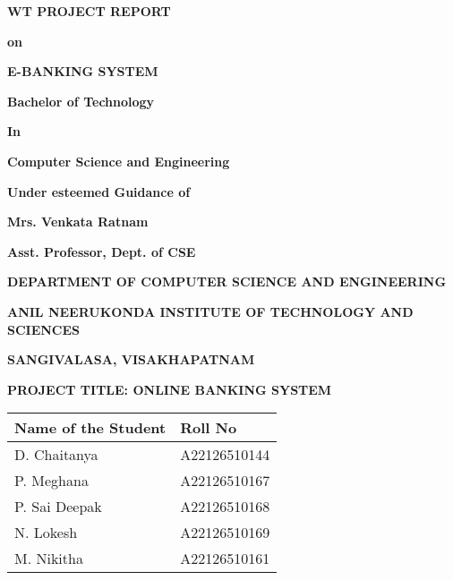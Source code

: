 \documentclass[12pt,a4paper]{report}
\begin{document}
\begin{titlepage}
    \centering
    \vspace*{1cm}
    {\huge\bfseries WT PROJECT REPORT\par}
    \vspace{1cm}
    {\Large\bfseries on\par}
    \vspace{1cm}
    {\huge\bfseries E-BANKING SYSTEM\par}
    \vspace{2cm}
    {\Large\bfseries Bachelor of Technology\par}
    \vspace{0.5cm}
    {\Large\bfseries In\par}
    \vspace{0.5cm}
    {\Large\bfseries Computer Science and Engineering\par}
    \vspace{2cm}
    {\Large\bfseries Under esteemed Guidance of\par}
    \vspace{0.5cm}
    {\Large\bfseries Mrs. Venkata Ratnam\par}
    \vspace{0.5cm}
    {\Large\bfseries Asst. Professor, Dept. of CSE\par}
    \vspace{2cm}
    {\Large\bfseries DEPARTMENT OF COMPUTER SCIENCE AND ENGINEERING\par}
    \vspace{0.5cm}
    {\Large\bfseries ANIL NEERUKONDA INSTITUTE OF TECHNOLOGY AND SCIENCES\par}
    \vspace{0.5cm}
    {\Large\bfseries SANGIVALASA, VISAKHAPATNAM\par}
\end{titlepage}

\thispagestyle{empty}
\begin{center}
    \LARGE\textbf{PROJECT TITLE: ONLINE BANKING SYSTEM}\\
    \vspace{2cm}

    \begin{tabular}{|l|l|}
        \hline
        \textbf{Name of the Student} & \textbf{Roll No} \\
        \hline
        D. Chaitanya & A22126510144 \\
        \hline
        P. Meghana & A22126510167 \\
        \hline
        P. Sai Deepak & A22126510168 \\
        \hline
        N. Lokesh & A22126510169 \\
        \hline
        M. Nikitha & A22126510161 \\
        \hline
    \end{tabular}
\end{center}
\newpage
\end{document}
